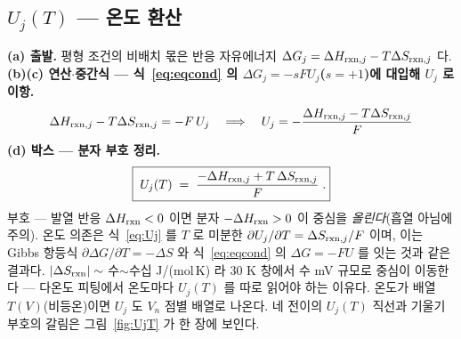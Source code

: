\subsection{$U_j(T)$ --- 온도 환산}\label{sec:center-Uj}
\textbf{(a) 출발.} 평형 조건의 비배치 몫은 반응 자유에너지 $\Delta G_j=\Delta H_{\mathrm{rxn},j}-T\Delta S_{\mathrm{rxn},j}$ 다.
\textbf{(b)(c) 연산$\cdot$중간식 --- 식~\eqref{eq:eqcond} 의 $\Delta G_j=-sFU_j$($s=+1$)에 대입해 $U_j$ 로 이항.}
\begin{equation}
\Delta H_{\mathrm{rxn},j}-T\Delta S_{\mathrm{rxn},j}=-F\,U_j
\quad\Longrightarrow\quad
U_j=-\frac{\Delta H_{\mathrm{rxn},j}-T\Delta S_{\mathrm{rxn},j}}{F}
\label{eq:Ujmid}
\end{equation}
\textbf{(d) 박스 --- 분자 부호 정리.}
\begin{equation}
\boxed{\;U_j(T)\;=\;\frac{-\Delta H_{\mathrm{rxn},j}+T\,\Delta S_{\mathrm{rxn},j}}{F}\;.}
\label{eq:Uj}
\end{equation}
부호 --- 발열 반응
$\Delta H_{\mathrm{rxn}}<0$ 이면 분자 $-\Delta H_{\mathrm{rxn}}>0$ 이 중심을 \emph{올린다}(흡열 아님에 주의). 온도 의존은 식~\eqref{eq:Uj} 를
$T$ 로 미분한 $\partial U_j/\partial T=\Delta S_{\mathrm{rxn},j}/F$ 이며, 이는 Gibbs 항등식 $\partial\Delta G/\partial T=-\Delta S$ 와
식~\eqref{eq:eqcond} 의 $\Delta G=-FU$ 를 잇는 것과 같은 결과다. $|\Delta S_{\mathrm{rxn}}|\sim$ 수$\sim$수십 J/(mol\,K) 라 $30$ K
창에서 수 mV 규모로 중심이 이동한다 --- 다온도 피팅에서 온도마다 $U_j(T)$ 를 따로 읽어야 하는 이유다. 온도가 배열
$T(V)$(비등온)이면 $U_j$ 도 $V_n$ 점별 배열로 나온다. 네 전이의 $U_j(T)$ 직선과 기울기 부호의 갈림은
그림~\ref{fig:UjT} 가 한 장에 보인다.

